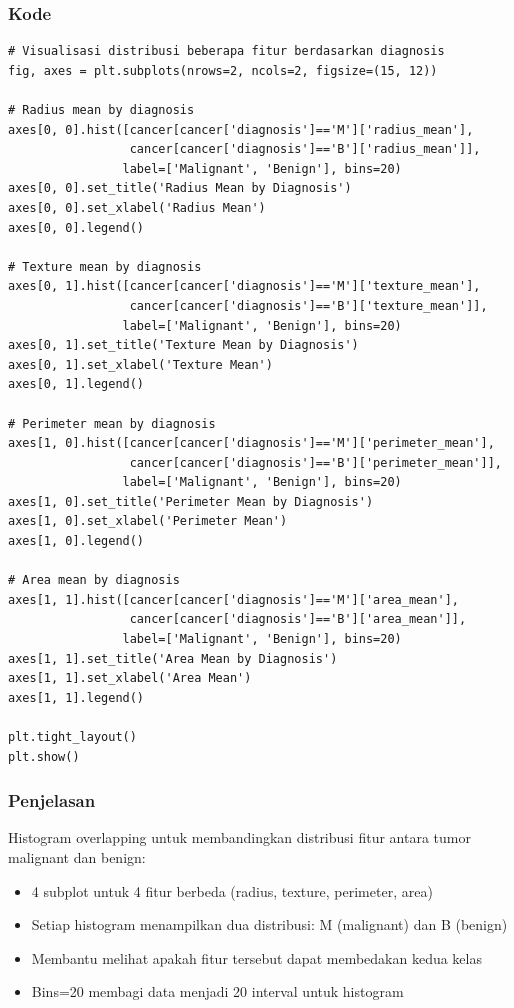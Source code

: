 \documentclass[12pt,a4paper]{article}
\begin{document}
\subsubsection{Kode}
\begin{lstlisting}[style=pythonstyle]
# Visualisasi distribusi beberapa fitur berdasarkan diagnosis
fig, axes = plt.subplots(nrows=2, ncols=2, figsize=(15, 12))

# Radius mean by diagnosis
axes[0, 0].hist([cancer[cancer['diagnosis']=='M']['radius_mean'], 
                 cancer[cancer['diagnosis']=='B']['radius_mean']], 
                label=['Malignant', 'Benign'], bins=20)
axes[0, 0].set_title('Radius Mean by Diagnosis')
axes[0, 0].set_xlabel('Radius Mean')
axes[0, 0].legend()

# Texture mean by diagnosis
axes[0, 1].hist([cancer[cancer['diagnosis']=='M']['texture_mean'], 
                 cancer[cancer['diagnosis']=='B']['texture_mean']], 
                label=['Malignant', 'Benign'], bins=20)
axes[0, 1].set_title('Texture Mean by Diagnosis')
axes[0, 1].set_xlabel('Texture Mean')
axes[0, 1].legend()

# Perimeter mean by diagnosis
axes[1, 0].hist([cancer[cancer['diagnosis']=='M']['perimeter_mean'], 
                 cancer[cancer['diagnosis']=='B']['perimeter_mean']], 
                label=['Malignant', 'Benign'], bins=20)
axes[1, 0].set_title('Perimeter Mean by Diagnosis')
axes[1, 0].set_xlabel('Perimeter Mean')
axes[1, 0].legend()

# Area mean by diagnosis
axes[1, 1].hist([cancer[cancer['diagnosis']=='M']['area_mean'], 
                 cancer[cancer['diagnosis']=='B']['area_mean']], 
                label=['Malignant', 'Benign'], bins=20)
axes[1, 1].set_title('Area Mean by Diagnosis')
axes[1, 1].set_xlabel('Area Mean')
axes[1, 1].legend()

plt.tight_layout()
plt.show()
\end{lstlisting}

\subsubsection{Penjelasan}
Histogram overlapping untuk membandingkan distribusi fitur antara tumor malignant dan benign:
\begin{itemize}
    \item 4 subplot untuk 4 fitur berbeda (radius, texture, perimeter, area)
    \item Setiap histogram menampilkan dua distribusi: M (malignant) dan B (benign)
    \item Membantu melihat apakah fitur tersebut dapat membedakan kedua kelas
    \item Bins=20 membagi data menjadi 20 interval untuk histogram
\end{itemize}
\end{document}
